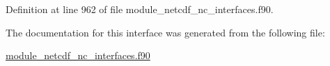 Definition at line 962 of file module\+\_\+netcdf\+\_\+nc\+\_\+interfaces.\+f90.



The documentation for this interface was generated from the following file\+:\begin{DoxyCompactItemize}
\item 
\hyperlink{module__netcdf__nc__interfaces_8f90}{module\+\_\+netcdf\+\_\+nc\+\_\+interfaces.\+f90}\end{DoxyCompactItemize}
